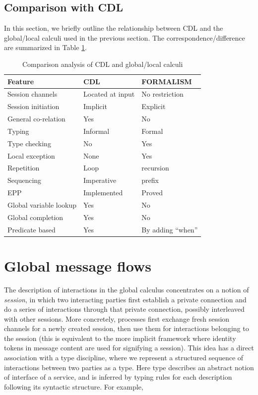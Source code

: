 \subsection{Comparison with CDL}

In this section, we briefly outline the relationship between CDL and the global/local calculi used in the previous section. The correspondence/difference are summarized in Table \ref{tab:comparison-cdl}.


\begin{longtable}{|p{}|l|l|}
\caption{Comparison analysis of CDL and global/local calculi}\label{tab:comparison-cdl} \\
\hline
\textbf{Feature} & \textbf{CDL} & \textbf{FORMALISM} \\
\hline
\endhead
Session channels & Located at input & No restriction \\
\hline
Session initiation & Implicit & Explicit \\
\hline
{General co-relation} & Yes & No \\ 
\hline 
{Typing} & Informal & Formal \\ 
\hline 
{Type checking} & No & Yes \\ 
\hline 
{Local exception} & None & Yes \\ 
\hline 
{Repetition} & Loop  & recursion \\ 
\hline 
{Sequencing} & Imperative & prefix \\ 
\hline 
{EPP} & Implemented & Proved \\ 
\hline 
{Global variable lookup} & Yes & No \\ 
\hline 
{Global completion} & Yes & No \\ 
\hline 
{Predicate based } & Yes & By adding ``when'' \\ \hline 
\end{longtable}


\section{Global message flows}
\label{sec:flows}

The description of interactions in the global calculus concentrates on a notion of \textit{session}, in which two interacting parties first establish a private connection and do a series of interactions through that private connection, possibly interleaved with other sessions. More concretely, processes first exchange fresh session channels for a newly created session, then use them for interactions belonging to the session (this is equivalent to the more implicit framework where identity tokens in message content are used for signifying a session). This idea has a direct association with a type discipline, where we represent a structured sequence of interactions between two parties as a type. Here type describes an abstract notion of interface of a service, and is inferred by typing rules for each description following its syntactic structure. For example,

